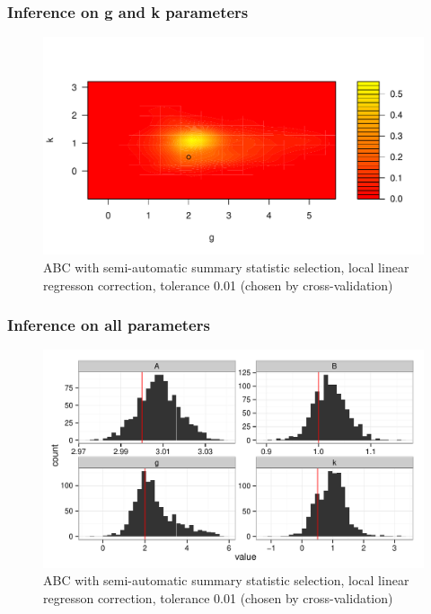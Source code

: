 \documentclass{beamer}
\begin{document}
\begin{frame}
\frametitle{Inference on g and k parameters}
\begin{figure}
\includegraphics[width = \linewidth]{GK_REG_M_CONT_GK_SA.pdf}
\caption{ABC with semi-automatic summary statistic selection, local linear regresson correction, tolerance 0.01 (chosen by cross-validation)}
\end{figure}
\end{frame}

\begin{frame}
\frametitle{Inference on all parameters}
\begin{figure}
\includegraphics[width = \linewidth]{GK_REG_M_HIST_SA.pdf}
\caption{ABC with semi-automatic summary statistic selection, local linear regresson correction, tolerance 0.01 (chosen by cross-validation)}
\end{figure}
\end{frame}
\end{document}
